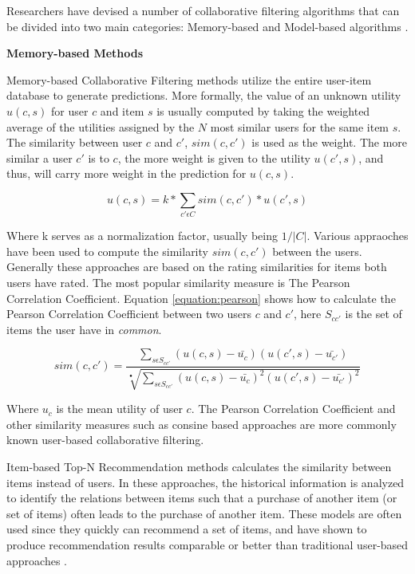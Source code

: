 Researchers have devised a number of collaborative filtering algorithms that can be divided into two main categories: Memory-based and Model-based algorithms \cite{Su2009}.\linebreak[4]

\textbf{Memory-based Methods}

Memory-based Collaborative Filtering methods utilize the entire user-item database to generate predictions. More formally, the value of an unknown utility $u(c,s)$ for user $c$ and item $s$ is usually computed by taking the weighted average of the utilities assigned by the $N$ most similar users for the same item $s$. The similarity between user $c$ and $c'$, $sim(c, c')$ is used as the weight. The more similar a user $c'$ is to $c$, the more weight is given to the utility $u(c', s)$, and thus, will carry more weight in the prediction for $u(c,s)$.

\begin{equation}
\label{equation:cfratingprediction}
u(c,s) = k * \sum_{c' \epsilon C} sim(c, c') * u(c',s)
\end{equation}

Where k serves as a normalization factor, usually being $1/|C|$. Various appraoches have been used to compute the similarity $sim(c, c')$ between the users. Generally these approaches are based on the rating similarities for items both users have rated. The most popular similarity measure is The Pearson Correlation Coefficient. Equation \ref{equation:pearson} shows how to calculate the Pearson Correlation Coefficient between two users $c$ and $c'$, here $S_{cc'}$ is the set of items the user have in \emph{common}.

\begin{equation}
sim(c, c') = \frac{\sum_{s \epsilon S_{cc'}} (u(c, s)-\bar{u_{c}})(u(c',s)-\bar{u_{c'}})}{\sqrt[•]{\sum_{s \epsilon S_{cc'}} (u(c, s)-\bar{u_{c}})^{2}(u(c',s)-\bar{u_{c'}})^{2}}}
\end{equation}

Where $u_{c}$ is the mean utility of user $c$. The Pearson Correlation Coefficient and other similarity measures such as consine based approaches are more commonly known user-based collaborative filtering.\linebreak[4]

Item-based Top-N Recommendation methods calculates the similarity between items instead of users. In these approaches, the historical information is analyzed to identify the relations between items such that a purchase of another item (or set of items) often leads to the purchase of another item. These models are often used since they quickly can recommend a set of items, and have shown to produce recommendation results comparable or better than traditional user-based approaches \cite{Karypis2001}.

